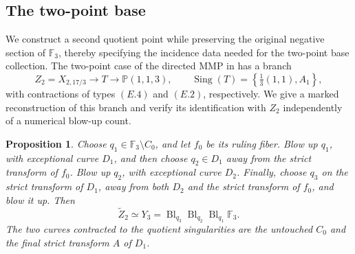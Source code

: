 \documentclass[11pt]{article}
\theoremstyle{plain}
\newtheorem{proposition}[proposition]{Proposition}
\theoremstyle{definition}
\theoremstyle{remark}
\newcommand{\Pp}{\mathbb P}
\newcommand{\F}{\mathbb F}
\newcommand{\Sing}{\operatorname{Sing}}
\newcommand{\Bl}{\operatorname{Bl}}
\begin{document}
\subsection{The two-point base}
\label{app:explicit-base-two}

We construct a second quotient point while preserving the original
negative section of \(\F_3\), thereby specifying the incidence data
needed for the two-point base collection.
The two-point case of the directed MMP in \cite[Section~6]{Corti2016}
has a branch
\[
Z_2=X_{2,17/3}\longrightarrow T\longrightarrow\Pp(1,1,3),
\qquad \Sing(T)=\left\{\tfrac13(1,1),A_1\right\},
\]
with contractions of types \((E.4)\) and \((E.2)\), respectively.
We give a marked reconstruction of this branch and verify its
identification with \(Z_2\) independently of a numerical blow-up count.

\begin{proposition}\label{prop:explicit-base-two}
Choose \(q_1\in\F_3\setminus C_0\), and let \(f_0\) be its ruling
fiber. Blow up \(q_1\), with exceptional curve \(D_1\), and then choose
\(q_2\in D_1\) away from the strict transform of \(f_0\). Blow up
\(q_2\), with exceptional curve \(D_2\). Finally, choose \(q_3\) on
the strict transform of \(D_1\), away from both \(D_2\) and the strict
transform of \(f_0\), and blow it up. Then
\[
\widetilde Z_2\simeq
Y_3=\Bl_{q_3}\Bl_{q_2}\Bl_{q_1}\F_3.
\]
The two curves contracted to the quotient singularities are the untouched
\(C_0\) and the final strict transform \(A\) of \(D_1\).
\end{proposition}
\end{document}
